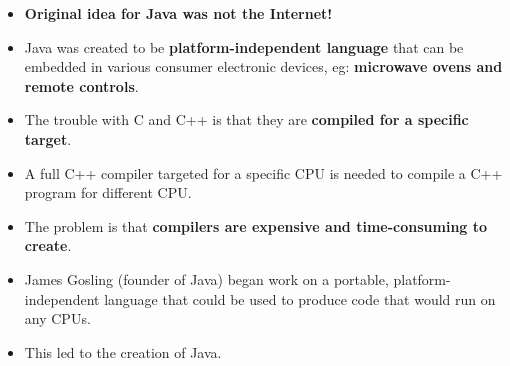 
\begin{flushleft}
	
	\begin{itemize}
		\item \textbf{Original idea for Java was not the Internet!}
		\item Java was created to be \textbf{platform-independent language} that can be embedded in various consumer electronic devices, eg: \textbf{microwave ovens and remote controls}. 
		\item The trouble with C and C++  is that they are \textbf{compiled for a specific target}. 
		\item A full C++ compiler targeted for a specific CPU is needed to compile a C++ program for different CPU.
		\item The problem is that \textbf{compilers are expensive and time-consuming to create}. 
		\item James Gosling (founder of Java) began work on a portable, platform-independent language that could be used to produce code that would run on any CPUs.
		\item This led to the creation of Java.
	\end{itemize}
	
	
\end{flushleft}


